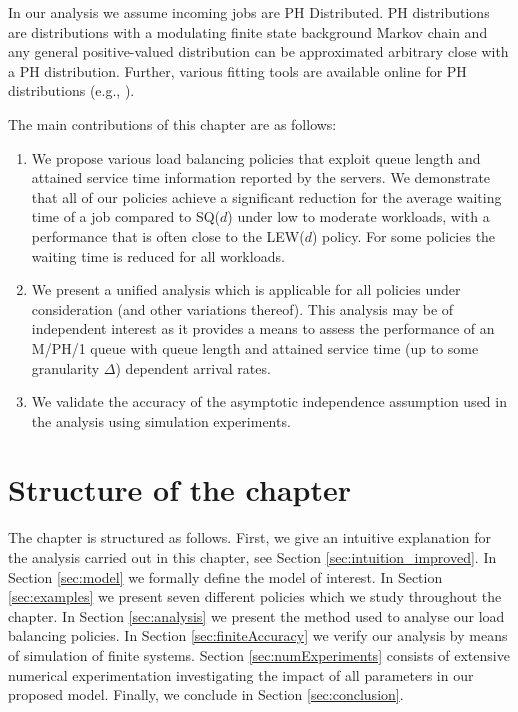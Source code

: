 \documentclass[12pt]{report}
\begin{document}
In our analysis we assume incoming jobs are PH Distributed. PH distributions are distributions with a modulating finite state background Markov chain \cite{latouche1} and any general positive-valued distribution can be approximated arbitrary close with a PH distribution. Further, various fitting tools are available online 
for PH distributions (e.g., \cite{panchenko1,Kriege2014}).

The main contributions of this chapter are as follows:
\begin{enumerate}
\item 
We propose various load balancing policies that exploit queue length and attained service
time information reported by the servers. We demonstrate that all of our policies achieve
a significant reduction for the average waiting time of a job compared to SQ($d$) under low to moderate workloads, with a performance that is often close to the LEW($d$) policy. For some policies the waiting time is reduced for all workloads.
\item We present a unified analysis which is applicable for all policies under consideration
(and other variations thereof). This analysis may be of independent interest as it provides
a means to assess the performance of an M/PH/1 queue with queue length and attained service
time (up to some granularity $\Delta$) dependent arrival rates.
\item We validate the accuracy of the asymptotic independence assumption used in the analysis
using simulation experiments. 
\end{enumerate}

\section{Structure of the chapter}
The chapter is structured as follows. First, we give an intuitive explanation for the analysis carried out in this chapter, see Section \ref{sec:intuition_improved}. In Section \ref{sec:model} we formally define the model of interest. In Section \ref{sec:examples} we present seven different policies which we study throughout the chapter. In Section \ref{sec:analysis} we present the method used to analyse our
load balancing policies. In Section \ref{sec:finiteAccuracy} we verify our analysis by means of simulation of finite systems. Section \ref{sec:numExperiments} consists of extensive numerical experimentation investigating the impact of all parameters in our proposed model. Finally, we conclude in Section \ref{sec:conclusion}.
\end{document}
